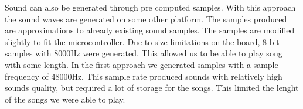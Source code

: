 Sound can also be generated through pre computed samples. With this approach the sound waves are generated on some other platform. The samples produced are approximations to already existing sound samples. The samples are modified slightly to fit the microcontroller. Due to size limitations on the board, 8 bit samples with 8000Hz were generated. This allowed us to be able to play song with some length. In the first approach we generated samples with a sample frequency of 48000Hz. This sample rate produced sounds with relatively high sounds quality, but required a lot of storage for the songs. This limited the lenght of the songs we were able to play. 

